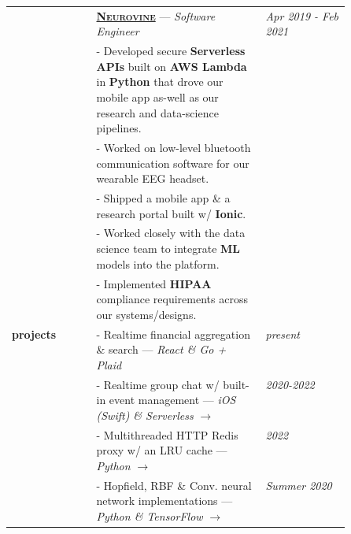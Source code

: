\documentclass[9pt]{article}
\begin{document}
\begin{longtable}{@{}>{\raggedleft}p{0.25\linewidth}
                          p{}>{}p{0.25\linewidth}@{}}
            & \textbf{\textsc{\href{https://www.neurovine.ai/}{Neurovine}} } --- \textit{Software Engineer}  & \textit{Apr 2019 - Feb 2021} \\ [0.5em]

            & - Developed secure \textbf{Serverless APIs} built on \textbf{AWS Lambda} in \textbf{Python} that drove our mobile app as-well as our research and data-science pipelines. \\
            & - Worked on low-level bluetooth communication software for our wearable EEG headset. \\
		    & - Shipped a mobile app \& a research portal built w/ \textbf{Ionic}. \\
		    & - Worked closely with the data science team to integrate \textbf{ML} models into the platform. \\
		    & - Implemented \textbf{HIPAA} compliance requirements across our systems/designs. \\ [1.5em]

        \textbf{projects}
            & - Realtime financial aggregation \& search --- \textit{React \& Go + Plaid} & \textit{present} \\ [0.5em]

            & - Realtime group chat w/ built-in event management --- \textit{iOS (Swift) \& Serverless} \href{https://github.com/boshd/handshake}{$\rightarrow$} & \textit{2020-2022} \\ [0.5em]

            & - Multithreaded HTTP Redis proxy w/ an LRU cache --- \textit{Python} \href{https://github.com/boshd/rp}{$\rightarrow$} & \textit{2022} \\ [0.5em]

            & - Hopfield, RBF \& Conv. neural network implementations --- \textit{Python \& TensorFlow} \href{https://github.com/boshd/neuralnets}{$\rightarrow$} & \textit{Summer 2020} \\ [0.5em]


\end{longtable}
\end{document}
